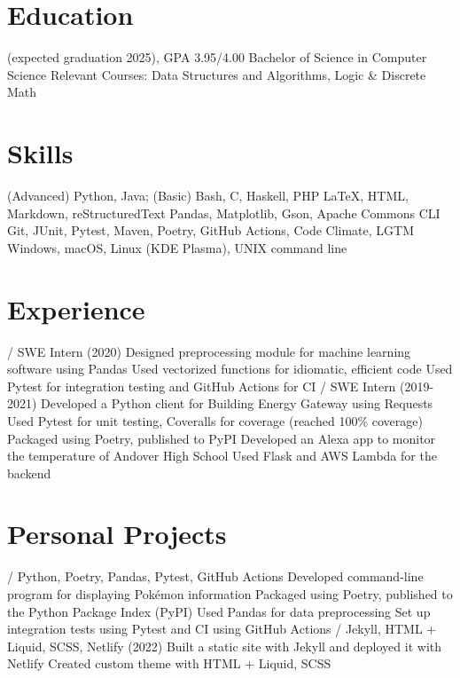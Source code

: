 \begin{outline}
\renewcommand{\outlinei}{description}

\0 \section{Education}
     (expected graduation 2025),  GPA 3.95/4.00
        \2 Bachelor of Science in Computer Science
        \2 Relevant Courses: Data Structures and Algorithms, Logic \& Discrete Math

\0 \section{Skills}
     (Advanced) Python, Java; (Basic) Bash, C, Haskell, PHP 
     \LaTeX, HTML, Markdown, reStructuredText 
    \1[Libraries] Pandas, Matplotlib, Gson, Apache Commons CLI 
    \1[Tools] Git, JUnit, Pytest, Maven, Poetry, GitHub Actions, Code Climate, LGTM 
     Windows, macOS, Linux (KDE Plasma), UNIX command line 

\0 \section{Experience}
     / SWE Intern (2020)
        \2 Designed preprocessing module for machine learning software using Pandas
        \2 Used vectorized functions for idiomatic, efficient code
        \2 Used Pytest for integration testing and GitHub Actions for CI
     / SWE Intern (2019-2021)
        \2 Developed a Python client for Building Energy Gateway using Requests
        \2 Used Pytest for unit testing, Coveralls for coverage (reached 100\% coverage)
        \2 Packaged using Poetry, published to PyPI
        \2 Developed an Alexa app to monitor the temperature of Andover High School
        \2 Used Flask and AWS Lambda for the backend

\0 \section{Personal Projects}
    \1[Pokésummary] / Python, Poetry, Pandas, Pytest, GitHub Actions
        \2 Developed command-line program for displaying Pokémon information
        \2 Packaged using Poetry, published to the Python Package Index (PyPI)
        \2 Used Pandas for data preprocessing
        \2 Set up integration tests using Pytest and CI using GitHub Actions
     / Jekyll, HTML + Liquid, SCSS, Netlify (2022)
        \2 Built a static site with Jekyll and deployed it with Netlify
        \2 Created custom theme with HTML + Liquid, SCSS


\end{outline}
